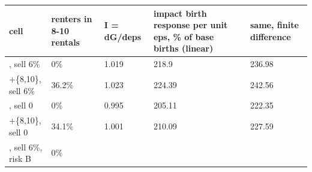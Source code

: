 \begingroup\small
\setlength{\tabcolsep}{3pt}
\renewcommand{\arraystretch}{1.04}
\begin{tabularx}{\linewidth}{XXXXX}
\toprule
cell & renters in 8-10 rentals & I = dG/deps & impact birth response per unit eps, \% of base births (linear) & same, finite difference \\
\midrule
[0,6], sell 6\% & 0\% & 1.019 & 218.9 & 236.98 \\
[0,6]+\{8,10\}, sell 6\% & 36.2\% & 1.023 & 224.39 & 242.56 \\
[0,6], sell 0 & 0\% & 0.995 & 205.11 & 222.35 \\
[0,6]+\{8,10\}, sell 0 & 34.1\% & 1.001 & 210.09 & 227.59 \\
[0,6], sell 6\%, risk B & 0\% &  &  &  \\
\bottomrule
\end{tabularx}
\endgroup
